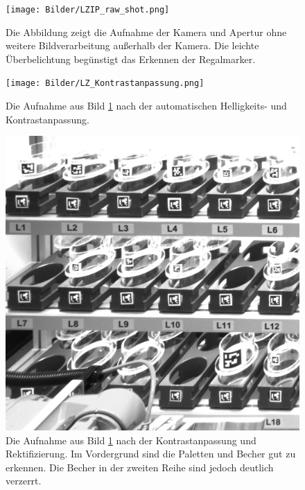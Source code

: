     \begin{figure}
        \caption[Bildaufnahme aus der Lagerzelle von der Übersichtskamera.]
        {\small Die Abbildung zeigt die Aufnahme der Kamera und Apertur ohne weitere Bildverarbeitung außerhalb der Kamera. Die leichte Überbelichtung begünstigt das Erkennen der Regalmarker.}\label{fig:figure12}
        \texttt{[image: Bilder/LZIP\_raw\_shot.png]}
        \centering
    \end{figure}

    \begin{figure}
        \caption[Bildaufnahme aus der Lagerzelle nach der Kontrastanpassung.]
        {\small Die Aufnahme aus Bild \ref{fig:figure12} nach der automatischen Helligkeits- und Kontrastanpassung.}\label{fig:figure13}
        \texttt{[image: Bilder/LZ\_Kontrastanpassung.png]}
        \centering
    \end{figure}

    \begin{figure}
        \caption[Bild aus der Lagerzelle nach der Rektifizierung und Zuschnitt auf relevanten Regalbereich]
        {\small Die Aufnahme aus Bild \ref{fig:figure12} nach der Kontrastanpassung und Rektifizierung. Im Vordergrund sind die Paletten und Becher gut zu erkennen. Die Becher in der zweiten Reihe sind jedoch deutlich verzerrt.}\label{fig:figure14}
        \includegraphics[width = \textwidth]{Bilder/LZ_transformed.png}
        \centering
    \end{figure}

